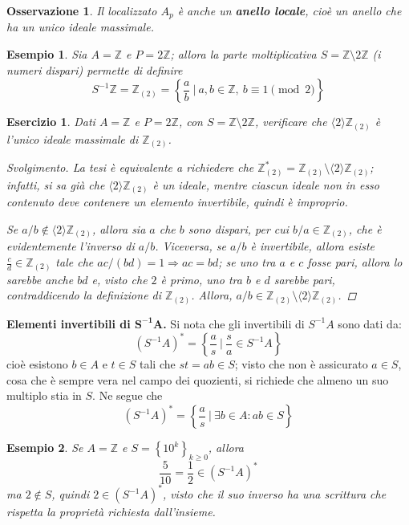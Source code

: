\documentclass[12pt]{scrartcl}
\theoremstyle{style}
\newtheorem{esempio}{Esempio}[section]
\newtheorem{osservazione}{Osservazione}[section]
\newtheorem{esercizio}{Esercizio}[section]
\newenvironment{svolgimento}{\renewcommand\qedsymbol{$\blacksquare$}\begin{proof}[Svolgimento]}{\end{proof}}
\numberwithin{equation}{subsection}
\begin{document}
\begin{osservazione}
Il localizzato $A_p$ \`e anche un \textbf{anello locale}, cio\`e un anello che ha un unico ideale massimale.
\end{osservazione}
\begin{esempio}
Sia $A = \mathbb{Z}$ e $P = 2\mathbb{Z}$; allora la parte moltiplicativa $S = \mathbb{Z} \setminus 2\mathbb{Z}$ (i numeri dispari) permette di definire
\[
S^{-1}\mathbb{Z} = \mathbb{Z}_{(2)} = \left\{ \frac{a}{b} \ \bigg\lvert \ a, b\in \mathbb{Z}, \ b \equiv 1  \pmod{2}  \right\} 
\] 
\end{esempio}
\begin{esercizio}
	Dati $A = \mathbb{Z}$ e $P =2\mathbb{Z}$, con $S = \mathbb{Z} \setminus 2\mathbb{Z}$, verificare che $\langle 2 \rangle\mathbb{Z}_{(2)}$ \`e l'unico ideale massimale di $\mathbb{Z}_{(2)} $.
	\begin{svolgimento}
		La tesi \`e equivalente a richiedere che $\mathbb{Z}_{(2)} ^* = \mathbb{Z}_{(2)} \setminus\langle 2 \rangle\mathbb{Z}_{(2)} $; infatti, si sa gi\`a che $\langle 2 \rangle\mathbb{Z}_{(2)} $ \`e un ideale, mentre ciascun ideale non in esso contenuto deve contenere un elemento invertibile, quindi \`e improprio.

		Se $a / b \not \in \langle 2 \rangle\mathbb{Z}_{(2)} $, allora sia $a$ che $b$ sono dispari, per cui $b/a \in \mathbb{Z}_{(2)} $, che \`e evidentemente l'inverso di $a / b$.
		Viceversa, se $a / b$ \`e invertibile, allora esiste $ \frac{c}{ d} \in \mathbb{Z}_(2)$ tale che $ac / (bd) =1 \Rightarrow ac = bd$; se uno tra $a$ e $c$ fosse pari, allora lo sarebbe anche $bd$ e, visto che $2$ \`e primo, uno tra $b$ e $d$ sarebbe pari, contraddicendo la definizione di $\mathbb{Z}_{(2)} $.
		Allora, $a / b \in \mathbb{Z}_{(2)} \setminus \langle 2 \rangle\mathbb{Z}_{(2)} $.
	\end{svolgimento}
\end{esercizio}

\textbf{Elementi invertibili di $\mathbf{S^{-1}A} $.} 
Si nota che gli invertibili di $S^{-1}A$ sono dati da:
\[
	(S^{-1}A)^* = \left\{ \frac{a}{s} \ \bigg\lvert \ \frac{s}{a} \in S^{-1}A \right\} 
\] 
cio\`e esistono $b \in A$ e $t \in S$ tali che $st =  ab \in S$; visto che non \`e assicurato $a \in S$, cosa che \`e sempre vera nel campo dei quozienti, si richiede che almeno un suo multiplo stia in $S$.
Ne segue che 
\[
	(S^{-1}A) ^* = \left\{ \frac{a}{s} \ \bigg\lvert \ \exists b \in A : ab \in S \right\} 
\] 
\begin{esempio}
Se $A = \mathbb{Z}$ e $S = \left\{ 10^k \right\} _{k\ge 0} $, allora 
\[
\frac{5}{10}= \frac{1}{2}\in (S^{-1}A)^*
\] 
ma $2 \not \in S$, quindi $2 \in (S^{-1}A)^*$, visto che il suo inverso ha una scrittura che rispetta la propriet\`a richiesta dall'insieme.
\end{esempio}
\end{document}

